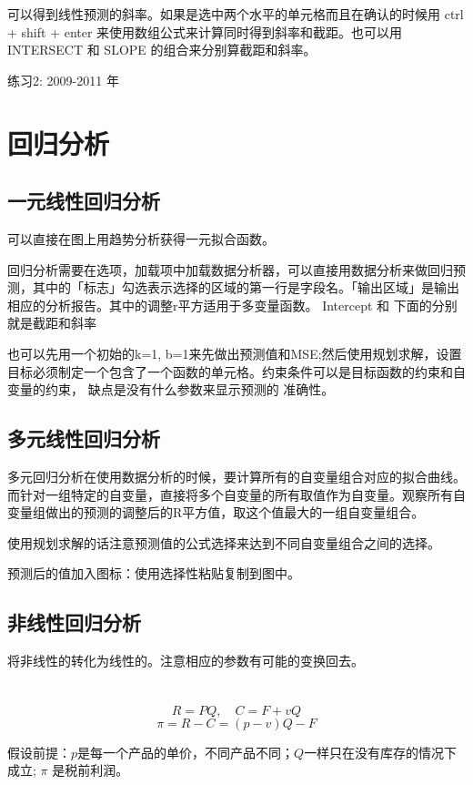\documentclass[10pt, a4paper]{article}
\begin{document}
        可以得到线性预测的斜率。如果是选中两个水平的单元格而且在确认的时候用 ctrl + shift + enter 来使用数组公式来计算同时得到斜率和截距。也可以用 INTERSECT 和 SLOPE 的组合来分别算截距和斜率。 
        
        练习2: 2009-2011 年

\section{回归分析}
    \subsection{一元线性回归分析}
        可以直接在图上用趋势分析获得一元拟合函数。
        
        回归分析需要在选项，加载项中加载数据分析器，可以直接用数据分析来做回归预测，其中的「标志」勾选表示选择的区域的第一行是字段名。「输出区域」是输出相应的分析报告。其中的调整r平方适用于多变量函数。 Intercept 和 下面的分别就是截距和斜率
        
        也可以先用一个初始的k=1, b=1来先做出预测值和MSE;然后使用规划求解，设置目标必须制定一个包含了一个函数的单元格。约束条件可以是目标函数的约束和自变量的约束， 缺点是没有什么参数来显示预测的 准确性。

    \subsection{多元线性回归分析}
        多元回归分析在使用数据分析的时候，要计算所有的自变量组合对应的拟合曲线。而针对一组特定的自变量，直接将多个自变量的所有取值作为自变量。观察所有自变量组做出的预测的调整后的R平方值，取这个值最大的一组自变量组合。

        使用规划求解的话注意预测值的公式选择来达到不同自变量组合之间的选择。

        预测后的值加入图标：使用选择性粘贴复制到图中。
    \subsection{非线性回归分析}
        将非线性的转化为线性的。注意相应的参数有可能的变换回去。

\section{}
    $$R = PQ, \quad C = F + vQ$$
    $$\pi = R - C = (p - v)Q - F$$

    假设前提：$p$是每一个产品的单价，不同产品不同；$Q$一样只在没有库存的情况下成立; $\pi$ 是税前利润。
\end{document}
